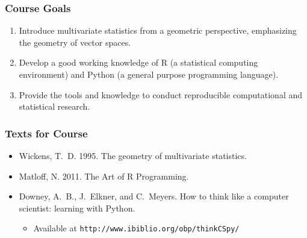 \documentclass{beamer}
\begin{document}
\begin{frame}
  \frametitle{Course Goals}

\begin{enumerate}

\item Introduce multivariate statistics from a geometric perspective, emphasizing the geometry of vector spaces. 

\item Develop a good working knowledge of R (a statistical computing environment) and Python (a general purpose programming language).

\item Provide the tools and knowledge to conduct reproducible computational and statistical research.


\end{enumerate}

\end{frame}




\begin{frame}
  \frametitle{Texts for Course}

\begin{itemize}

\item Wickens, T.\ D. 1995. The geometry of multivariate statistics. 

\item Matloff, N. 2011. The Art of R Programming. 

\item Downey, A.\ B., J.\ Elkner, and C.\ Meyers. How to think like a computer scientist: learning with Python. 
\begin{itemize}
	\item Available at \texttt{http://www.ibiblio.org/obp/thinkCSpy/}
\end{itemize}


\end{itemize}

\end{frame}
\end{document}
